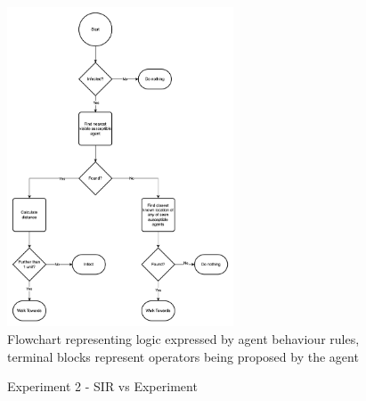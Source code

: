 \begin{figure}[H]
    \centering
    \includegraphics[width=0.6\textwidth]{images/chapter2/sir_logic2.drawio.png}
    \caption{Flowchart representing logic expressed by agent behaviour rules, terminal blocks represent operators being proposed by the agent}\label{fig:sir_logic2.drawio.png}
\end{figure}


\begin{figure}[H]
    \centering
    \hspace*{\fill}
    \caption{Experiment 2 - SIR vs Experiment} \label{fig:experiment1-diagrams}
\end{figure}

